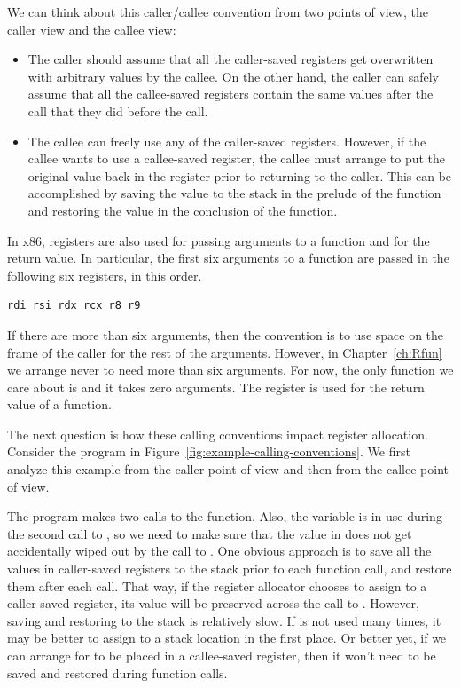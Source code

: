 \documentclass[11pt]{book}
\begin{document}
We can think about this caller/callee convention from two points of
view, the caller view and the callee view:
\begin{itemize}
\item The caller should assume that all the caller-saved registers get
  overwritten with arbitrary values by the callee.  On the other hand,
  the caller can safely assume that all the callee-saved registers
  contain the same values after the call that they did before the
  call.
\item The callee can freely use any of the caller-saved registers.
  However, if the callee wants to use a callee-saved register, the
  callee must arrange to put the original value back in the register
  prior to returning to the caller. This can be accomplished by saving
  the value to the stack in the prelude of the function and restoring
  the value in the conclusion of the function.
\end{itemize}

In x86, registers are also used for passing arguments to a function
and for the return value.  In particular, the first six arguments to a
function are passed in the following six registers, in this order.
\begin{lstlisting}
rdi rsi rdx rcx r8 r9
\end{lstlisting}
If there are more than six arguments, then the convention is to use
space on the frame of the caller for the rest of the
arguments. However, in Chapter~\ref{ch:Rfun} we arrange never to
need more than six arguments. For now, the only function we care about
is  and it takes zero arguments.
%
The register  is used for the return value of a function.

The next question is how these calling conventions impact register
allocation. Consider the \LangVar{} program in
Figure~\ref{fig:example-calling-conventions}.  We first analyze this
example from the caller point of view and then from the callee point
of view.

The program makes two calls to the  function.  Also, the
variable  is in use during the second call to , so
we need to make sure that the value in  does not get
accidentally wiped out by the call to .  One obvious
approach is to save all the values in caller-saved registers to the
stack prior to each function call, and restore them after each
call. That way, if the register allocator chooses to assign 
to a caller-saved register, its value will be preserved across the
call to .  However, saving and restoring to the stack is
relatively slow. If  is not used many times, it may be better
to assign  to a stack location in the first place. Or better
yet, if we can arrange for  to be placed in a callee-saved
register, then it won't need to be saved and restored during function
calls.
\end{document}

